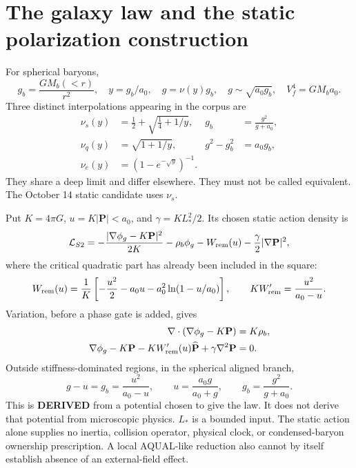 \documentclass[11pt]{article}
\newcommand{\Mb}{M_b}
\begin{document}
\section{The galaxy law and the static polarization construction}
For spherical baryons,
\begin{equation}
 g_b=\frac{G\Mb(<r)}{r^2},\quad y=g_b/a_0,\quad
 g=\nu(y)g_b,\quad g\sim\sqrt{a_0g_b},\quad V_f^4=G\Mb a_0.
\end{equation}
Three distinct interpolations appearing in the corpus are
\begin{align}
 \nu_s(y)&=\tfrac12+\sqrt{\tfrac14+1/y},
 &g_b&=\frac{g^2}{g+a_0},\\
 \nu_q(y)&=\sqrt{1+1/y},
 &g^2-g_b^2&=a_0g_b,\\
 \nu_e(y)&=(1-e^{-\sqrt y})^{-1}.
\end{align}
They share a deep limit and differ elsewhere. They must not be called
equivalent. The October 14 static candidate uses $\nu_s$.

Put $K=4\pi G$, $u=K|\mathbf P|<a_0$, and
$\gamma=K L_*^2/2$. Its chosen static action density is
\begin{equation}
 \mathcal L_{S2}=-\frac{|\nabla\phi_g-K\mathbf P|^2}{2K}
 -\rho_b\phi_g-W_{\rm rem}(u)-\frac\gamma2|\nabla\mathbf P|^2,
\end{equation}
where the critical quadratic part has already been included in the square:
\begin{equation}
 W_{\rm rem}(u)=\frac1K\left[-\frac{u^2}{2}-a_0u
 -a_0^2\ln(1-u/a_0)\right],\qquad
 K W'_{\rm rem}=\frac{u^2}{a_0-u}.
\end{equation}
Variation, before a phase gate is added, gives
\begin{align}
 \nabla\cdot(\nabla\phi_g-K\mathbf P)&=K\rho_b,\\
 \nabla\phi_g-K\mathbf P-KW'_{\rm rem}(u)\widehat{\mathbf P}
 +\gamma\nabla^2\mathbf P&=0.
\end{align}
Outside stiffness-dominated regions, in the spherical aligned branch,
\begin{equation}
 g-u=g_b=\frac{u^2}{a_0-u},\qquad
 u=\frac{a_0g}{a_0+g},\qquad g_b=\frac{g^2}{g+a_0}.
\end{equation}
This is \textbf{DERIVED} from a potential chosen to give the law. It does not
derive that potential from microscopic physics. $L_*$ is a bounded input.
The static action alone supplies no inertia, collision operator, physical
clock, or condensed-baryon ownership prescription. A local AQUAL-like
reduction also cannot by itself establish absence of an external-field effect.
\end{document}
